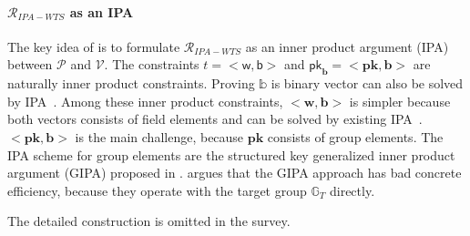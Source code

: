 \paragraph{$\mathcal{R}_{IPA-WTS}$ as an IPA} The key idea of \cite{DBLP:conf/ccs/DasCXNB023} is to formulate $\mathcal{R}_{IPA-WTS}$ as an inner product argument (IPA) between $\mathcal{P}$ and $\mathcal{V}$. The constraints $t=<\mathsf{w},\mathsf{b}>$ and $\mathsf{pk}_{\mathbf{b}} = <\mathbf{pk}, \mathbf{b}>$ are naturally inner product constraints. Proving $\mathbb{b}$ is binary vector can also be solved by IPA~\cite{DBLP:conf/sp/BunzBBPWM18}. Among these inner product constraints, $<\mathbf{w}, \mathbf{b}>$ is simpler because both vectors consists of field elements and can be solved by existing IPA~\cite{DBLP:conf/asiacrypt/CampanelliNRZZ22}. $<\mathbf{pk}, \mathbf{b}>$ is the main challenge, because $\mathbf{pk}$ consists of group elements. The IPA scheme for group elements are the structured key generalized inner product argument (GIPA) proposed in \cite{DBLP:conf/asiacrypt/BunzMMTV21,DBLP:conf/tcc/Lee21}. \cite{DBLP:conf/ccs/DasCXNB023} argues that the GIPA approach has bad concrete efficiency, because they operate with the target group $\mathbb{G}_T$ directly. 



The detailed construction is omitted in the survey. 